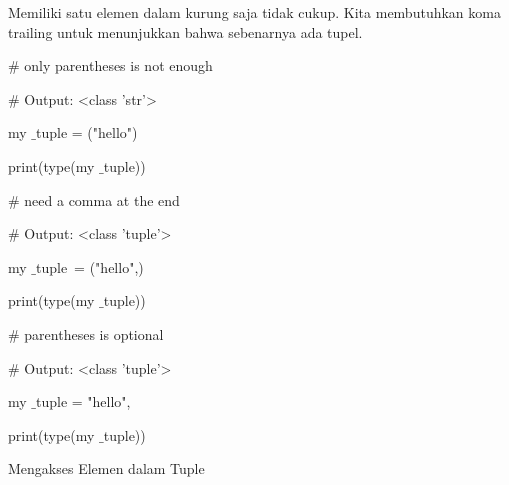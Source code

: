 \documentclass[a4paper,12pt]{report}
\begin{document}
\noindent 
\vspace{14pt}
\noindent 
{\fontsize{14pt}{14pt}\selectfont Memiliki satu elemen dalam kurung saja tidak cukup. Kita membutuhkan koma trailing untuk menunjukkan bahwa sebenarnya ada tupel. \\} \par
\vspace{20pt}
\noindent 
{\fontsize{20pt}{20pt}\selectfont  $  \#  $ only parentheses is not enough \\} \par
\noindent 
{\fontsize{20pt}{20pt}\selectfont  $  \#  $ Output: <class 'str'> \\} \par
\noindent 
{\fontsize{20pt}{20pt}\selectfont my $  \_  $tuple = ("hello") \\} \par
\noindent 
{\fontsize{20pt}{20pt}\selectfont print(type(my $  \_  $tuple)) \\} \par
\vspace{20pt}
\noindent 
{\fontsize{20pt}{20pt}\selectfont  $  \#  $ need a comma at the end \\} \par
\noindent 
{\fontsize{20pt}{20pt}\selectfont  $  \#  $ Output: <class 'tuple'> \\} \par
\noindent 
{\fontsize{20pt}{20pt}\selectfont my $  \_  $tuple~= ("hello",)   \\} \par
\noindent 
{\fontsize{20pt}{20pt}\selectfont print(type(my $  \_  $tuple)) \\} \par
\vspace{20pt}
\noindent 
{\fontsize{20pt}{20pt}\selectfont  $  \#  $ parentheses is optional \\} \par
\noindent 
{\fontsize{20pt}{20pt}\selectfont  $  \#  $ Output: <class 'tuple'> \\} \par
\noindent 
{\fontsize{20pt}{20pt}\selectfont my $  \_  $tuple = "hello", \\} \par
\noindent 
{\fontsize{20pt}{20pt}\selectfont print(type(my $  \_  $tuple)) \\} \par
\vspace{20pt}
\noindent 
{\fontsize{14pt}{14pt}\selectfont Mengakses Elemen dalam Tuple \\} \par
\end{document}
